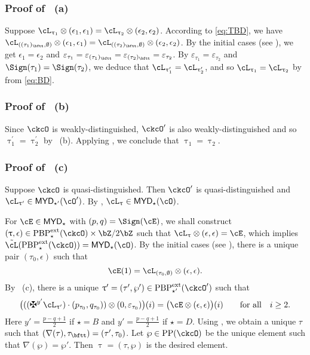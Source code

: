 \documentclass[12pt,a4paper]{amsart}
\def\MYD{{\mathsf{MYD}}}
\def\DD{\nabla}
\numberwithin{equation}{section}
\theoremstyle{remark}
\def\PBPes{\mathrm{PBP}^{\mathrm{ext}}_{\star}}
\def\PBPesp{\mathrm{PBP}^{\mathrm{ext}}_{\star'}}
\def\uptaup{\uptau^{\prime}}
\def\PP{\mathrm{PP}}
\begin{document}
\subsubsection*{Proof of ~(a)}
Suppose $\ac_{\uptau_1}\lotimes (\epsilon_{1},\epsilon_{1})
= \ac_{\uptau_2}\lotimes( \epsilon_{2},\epsilon_{2} )$.
According to \eqref{eq:TBD}, we have
$\cL_{((\tau_{1})_{\bftt},\emptyset)}\lotimes(\epsilon_{1},\epsilon_{1}) =
\cL_{((\tau_{2})_{\bftt},\emptyset)}\lotimes(\epsilon_{2},\epsilon_{2})$.
By the initial cases (see ), we get $\epsilon_{1}=\epsilon_{2}$ and
$\varepsilon_{\tau_{1}}=\varepsilon_{(\tau_{1})_{\bftt}}=\varepsilon_{(\tau_{2})_{\bftt}}=\varepsilon_{\tau_{2}}$.
By $\varepsilon_{\tau_1} = \varepsilon_{\tau_2}$ and
$\Sign(\tau_1)=\Sign(\tau_2)$, we deduce that
$\ac_{\uptaup_{1}}=\ac_{\uptaup_{2}}$, and so $\ac_{\uptau_1}= \ac_{\uptau_2}$ by from  \eqref{eq:BD}.

\subsubsection*{Proof of ~(b)}

Since $\ckcO$ is
weakly-distinguished, $\ckcO'$ is also weakly-distinguished and so
$\uptaup_{1}=\uptaup_{2}$ by ~(b). Applying , we
conclude that $\uptau_{1}=\uptau_{2}$.

\subsubsection*{Proof of ~(c)}

Suppose $\ckcO$ is quasi-distinguished.
Then $\ckcO'$ is quasi-distinguished and $\ac_{\uptau'}\in \MYD_{\star'}(\cO')$.
By , $\ac_{\uptau}\in \MYD_{\star}(\cO)$.



For $\cE\in \MYD_{\star}$ with $(p,q)=\Sign(\cE)$, we shall construct $(\uptau, \epsilon)\in
\PBPes(\ckcO)\times \bZ/2\bZ$ such that $\ac_{\uptau}\lotimes(\epsilon, \epsilon)=\cE$,
which implies $\acme(\PBPes(\ckcO)) = \MYD_{\star}(\cO)$. By the initial cases
(see ), there is a unique pair $(\tau_0, \epsilon)$ such that
\[
 \cE(1) = \ac_{(\tau_0,\emptyset)}\lotimes (\epsilon,\epsilon).
\]
By ~(c), there is a unique $\uptau' = (\tau',\wp')\in \PBPesp(\ckcO')$
such that
\[
 \big(((\maltese^{y'}\ac_{\uptau'})\cdot (p_{\tau_0},q_{\tau_0}))\lotimes (0,\varepsilon_{\tau_0})\big) (i)
 = \big(\cE\lotimes (\epsilon,\epsilon)\big)(i) \qquad \text{for all} \quad i\geq 2.
\]
Here $y' = \frac{p-q+1}{2}$ if $\star = B$ and $y' = \frac{p-q+1}{2}$ if $\star
= D$. Using , we obtain a unique $\tau$ such that
$(\DD(\tau),\taut) = (\tau',\tau_0)$. Let $\wp\in \PP(\ckcO)$ be the unique
element such that $\DD(\wp) = \wp'$. Then $\uptau = (\tau, \wp)$ is the desired element.
\end{document}
